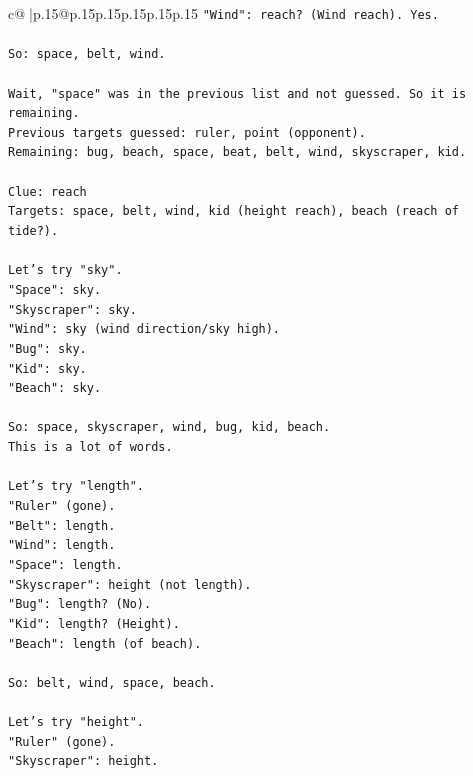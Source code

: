 \documentclass{article}
\begin{document}
{\begin{supertabular}{c@{$\;$}|p{.15\linewidth}@{}p{.15\linewidth}p{.15\linewidth}p{.15\linewidth}p{.15\linewidth}p{.15\linewidth}}
{{{\texttt{"Wind": reach? (Wind reach). Yes.} \\
\\ 
\texttt{So: space, belt, wind.} \\
\\ 
\texttt{Wait, "space" was in the previous list and not guessed. So it is remaining.} \\
\texttt{Previous targets guessed: ruler, point (opponent).} \\
\texttt{Remaining: bug, beach, space, beat, belt, wind, skyscraper, kid.} \\
\\ 
\texttt{Clue: reach} \\
\texttt{Targets: space, belt, wind, kid (height reach), beach (reach of tide?).} \\
\\ 
\texttt{Let's try "sky".} \\
\texttt{"Space": sky.} \\
\texttt{"Skyscraper": sky.} \\
\texttt{"Wind": sky (wind direction/sky high).} \\
\texttt{"Bug": sky.} \\
\texttt{"Kid": sky.} \\
\texttt{"Beach": sky.} \\
\\ 
\texttt{So: space, skyscraper, wind, bug, kid, beach.} \\
\texttt{This is a lot of words.} \\
\\ 
\texttt{Let's try "length".} \\
\texttt{"Ruler" (gone).} \\
\texttt{"Belt": length.} \\
\texttt{"Wind": length.} \\
\texttt{"Space": length.} \\
\texttt{"Skyscraper": height (not length).} \\
\texttt{"Bug": length? (No).} \\
\texttt{"Kid": length? (Height).} \\
\texttt{"Beach": length (of beach).} \\
\\ 
\texttt{So: belt, wind, space, beach.} \\
\\ 
\texttt{Let's try "height".} \\
\texttt{"Ruler" (gone).} \\
\texttt{"Skyscraper": height.} \\
}}}
\end{supertabular}}
\end{document}
